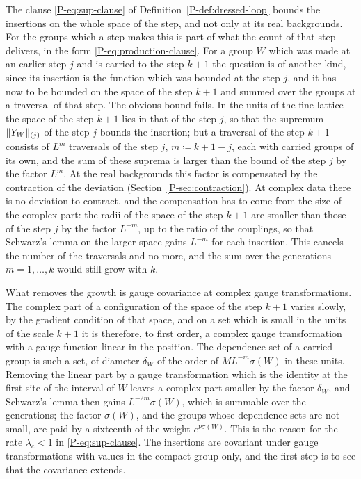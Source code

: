 The clause \eqref{P-eq:sup-clause} of Definition~\ref{P-def:dressed-loop} bounds the insertions on the whole space of the step, and not only at its real backgrounds. For the groups which a step makes this is part of what the count of that step delivers, in the form \eqref{P-eq:production-clause}. For a group $W$ which was made at an earlier step $j$ and is carried to the step $k + 1$ the question is of another kind, since its insertion is the function which was bounded at the step $j$, and it has now to be bounded on the space of the step $k + 1$ and summed over the groups at a traversal of that step. The obvious bound fails. In the units of the fine lattice the space of the step $k + 1$ lies in that of the step $j$, so that the supremum $\lVert Y_W\rVert_{(j)}$ of the step $j$ bounds the insertion; but a traversal of the step $k + 1$ consists of $L^m$ traversals of the step $j$, $m \coloneqq k + 1 - j$, each with carried groups of its own, and the sum of these suprema is larger than the bound of the step $j$ by the factor $L^m$. At the real backgrounds this factor is compensated by the contraction of the deviation (Section~\ref{P-sec:contraction}). At complex data there is no deviation to contract, and the compensation has to come from the size of the complex part: the radii of the space of the step $k + 1$ are smaller than those of the step $j$ by the factor $L^{-m}$, up to the ratio of the couplings, so that Schwarz's lemma on the larger space gains $L^{-m}$ for each insertion. This cancels the number of the traversals and no more, and the sum over the generations $m = 1, \dots, k$ would still grow with $k$.

What removes the growth is gauge covariance at complex gauge transformations. The complex part of a configuration of the space of the step $k + 1$ varies slowly, by the gradient condition of that space, and on a set which is small in the units of the scale $k + 1$ it is therefore, to first order, a complex gauge transformation with a gauge function linear in the position. The dependence set of a carried group is such a set, of diameter $\delta_W$ of the order of $ML^{-m}\sigma(W)$ in these units. Removing the linear part by a gauge transformation which is the identity at the first site of the interval of $W$ leaves a complex part smaller by the factor $\delta_W$, and Schwarz's lemma then gains $L^{-2m}\sigma(W)$, which is summable over the generations; the factor $\sigma(W)$, and the groups whose dependence sets are not small, are paid by a sixteenth of the weight $e^{\nu\sigma(W)}$. This is the reason for the rate $\lambda_c < 1$ in \eqref{P-eq:sup-clause}. The insertions are covariant under gauge transformations with values in the compact group only, and the first step is to see that the covariance extends.

